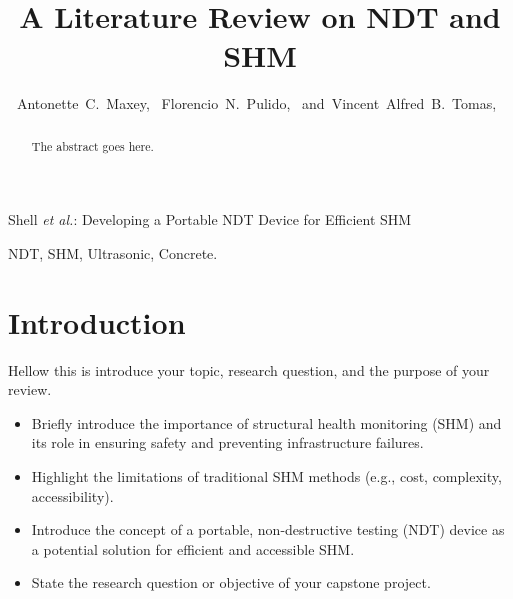 \documentclass[journal, a4paper]{IEEEtran}
\begin{document}
\title{A Literature Review on NDT and SHM}


\author{Antonette~C.~Maxey,~
        Florencio~N.~Pulido,~
        and~Vincent~Alfred~B.~Tomas,~%
}



%
{Shell \MakeLowercase{\textit{et al.}}: Developing a Portable NDT Device for Efficient SHM}


\maketitle


\begin{abstract}
The abstract goes here.
\end{abstract}


\begin{IEEEkeywords}
  NDT, SHM, Ultrasonic, Concrete.
\end{IEEEkeywords}







\section{Introduction}
Hellow this is
 introduce your topic, research question, and the purpose of your review.
\begin{itemize}
  \item Briefly introduce the importance of structural health monitoring (SHM) and its role in ensuring safety and preventing infrastructure failures.
  \item Highlight the limitations of traditional SHM methods (e.g., cost, complexity, accessibility).
  \item Introduce the concept of a portable, non-destructive testing (NDT) device as a potential solution for efficient and accessible SHM.
  \item State the research question or objective of your capstone project.
\end{itemize}
\end{document}
